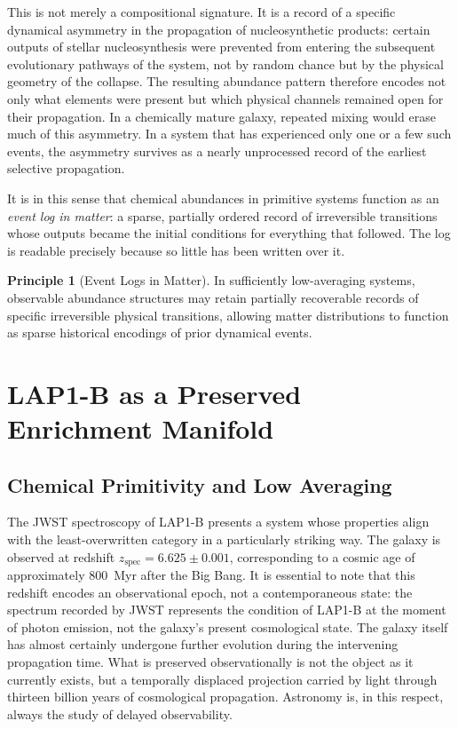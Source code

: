 \documentclass[12pt, a4paper]{article}
\theoremstyle{definition}
\newtheorem{principle}{Principle}
\begin{document}
This is not merely a compositional signature. It is a record of a specific
dynamical asymmetry in the propagation of nucleosynthetic products: certain
outputs of stellar nucleosynthesis were prevented from entering the subsequent
evolutionary pathways of the system, not by random chance but by the physical
geometry of the collapse. The resulting abundance pattern therefore encodes
not only what elements were present but which physical channels remained open
for their propagation. In a chemically mature galaxy, repeated mixing would
erase much of this asymmetry. In a system that has experienced only one or a
few such events, the asymmetry survives as a nearly unprocessed record of
the earliest selective propagation.

It is in this sense that chemical abundances in primitive systems function as
an \emph{event log in matter}: a sparse, partially ordered record of
irreversible transitions whose outputs became the initial conditions for
everything that followed. The log is readable precisely because so little
has been written over it.

\begin{principle}[Event Logs in Matter]
In sufficiently low-averaging systems, observable abundance structures may
retain partially recoverable records of specific irreversible physical
transitions, allowing matter distributions to function as sparse historical
encodings of prior dynamical events.
\end{principle}

\section{LAP1-B as a Preserved Enrichment Manifold}
\label{sec:lap1b}

\subsection{Chemical Primitivity and Low Averaging}

The JWST spectroscopy of LAP1-B \citep{Nakajima2026} presents a system
whose properties align with the least-overwritten category in a particularly
striking way. The galaxy is observed at redshift $z_{\mathrm{spec}} =
6.625 \pm 0.001$, corresponding to a cosmic age of approximately 800~Myr
after the Big Bang. It is essential to note that this redshift encodes an
observational epoch, not a contemporaneous state: the spectrum recorded by
JWST represents the condition of LAP1-B at the moment of photon emission,
not the galaxy's present cosmological state. The galaxy itself has almost
certainly undergone further evolution during the intervening propagation time.
What is preserved observationally is not the object as it currently exists,
but a temporally displaced projection carried by light through thirteen
billion years of cosmological propagation. Astronomy is, in this respect,
always the study of delayed observability.
\end{document}
